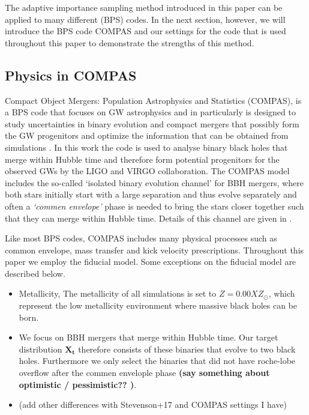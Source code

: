 \documentclass[a4paper,fleqn,usenatbib]{mnras}
\begin{document}
The adaptive importance sampling method introduced in this paper can be applied to many different (BPS) codes. 
In the next section,  however, we will introduce the BPS code COMPAS and our settings for the code that is used throughout this paper to demonstrate the strengths of this method. 
% 
%
%
\subsection{Physics in COMPAS}
\label{subsec:physicsCOMPAS}
%
Compact Object Mergers: Population Astrophysics and Statistics (COMPAS), is a BPS code that focuses on GW astrophysics and in particularly is designed to study uncertainties in binary evolution and  compact mergers that possibly form the GW progenitors  and optimize the information that can be obtained from simulations \citep{barrett2017accuracy}. In this work the code is used to analyse binary black holes that merge within Hubble time and therefore form potential progenitors for the observed GWs by the LIGO and VIRGO collaboration. The COMPAS model includes the so-called `isolated binary evolution channel' for BBH mergers, where both stars initially start with a large separation and thus evolve separately and often a \emph{`commen envelope'} phase is needed to bring the stars closer together such that they can merge within Hubble time. Details of this channel are given in \citep{belczynski2016first}.   

Like most BPS codes, COMPAS includes many physical processes such as common envelope, mass transfer and kick velocity prescriptions. Throughout this paper we employ the \citep{stevenson2017formation} fiducial model. 
Some exceptions on the fiducial model are described below. 

\begin{itemize}
	\item Metallicity, The metallicity of all simulations is set to $Z = 0.00X Z_{\odot}$, which represent the low metallicity environment where massive black holes can be born. 
	\item We focus on BBH mergers that merge within Hubble time. Our target distribution $\mathbf{X_t}$ therefore consists of these binaries that evolve to two black holes. Furthermore we only select  the binaries that did not have roche-lobe overflow after the commen envelople phase \textbf{(say something about optimistic / pessimistic?? )}. 
	\item (add other differences with Stevenson+17 and COMPAS settings I have)
\end{itemize}
\end{document}
